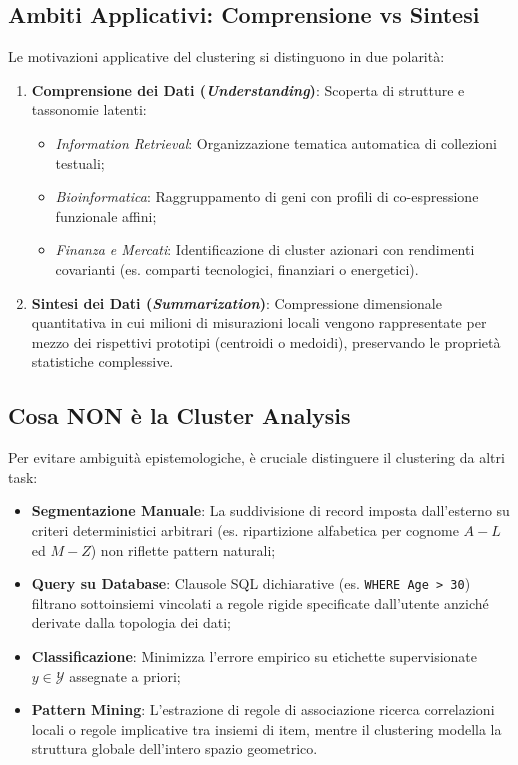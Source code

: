 \subsection{Ambiti Applicativi: Comprensione vs Sintesi}
Le motivazioni applicative del clustering si distinguono in due polarità:
\begin{enumerate}
    \item \textbf{Comprensione dei Dati (\textit{Understanding})}: Scoperta di strutture e tassonomie latenti:
    \begin{itemize}[noitemsep]
        \item \textit{Information Retrieval}: Organizzazione tematica automatica di collezioni testuali;
        \item \textit{Bioinformatica}: Raggruppamento di geni con profili di co-espressione funzionale affini;
        \item \textit{Finanza e Mercati}: Identificazione di cluster azionari con rendimenti covarianti (es. comparti tecnologici, finanziari o energetici).
    \end{itemize}
    \item \textbf{Sintesi dei Dati (\textit{Summarization})}: Compressione dimensionale quantitativa in cui milioni di misurazioni locali vengono rappresentate per mezzo dei rispettivi prototipi (centroidi o medoidi), preservando le proprietà statistiche complessive.
\end{enumerate}

\subsection{Cosa NON è la Cluster Analysis}
Per evitare ambiguità epistemologiche, è cruciale distinguere il clustering da altri task:
\begin{itemize}
    \item \textbf{Segmentazione Manuale}: La suddivisione di record imposta dall'esterno su criteri deterministici arbitrari (es. ripartizione alfabetica per cognome $A-L$ ed $M-Z$) non riflette pattern naturali;
    \item \textbf{Query su Database}: Clausole SQL dichiarative (es. \texttt{WHERE Age > 30}) filtrano sottoinsiemi vincolati a regole rigide specificate dall'utente anziché derivate dalla topologia dei dati;
    \item \textbf{Classificazione}: Minimizza l'errore empirico su etichette supervisionate $y \in \mathcal{Y}$ assegnate a priori;
    \item \textbf{Pattern Mining}: L'estrazione di regole di associazione ricerca correlazioni locali o regole implicative tra insiemi di item, mentre il clustering modella la struttura globale dell'intero spazio geometrico.
\end{itemize}

